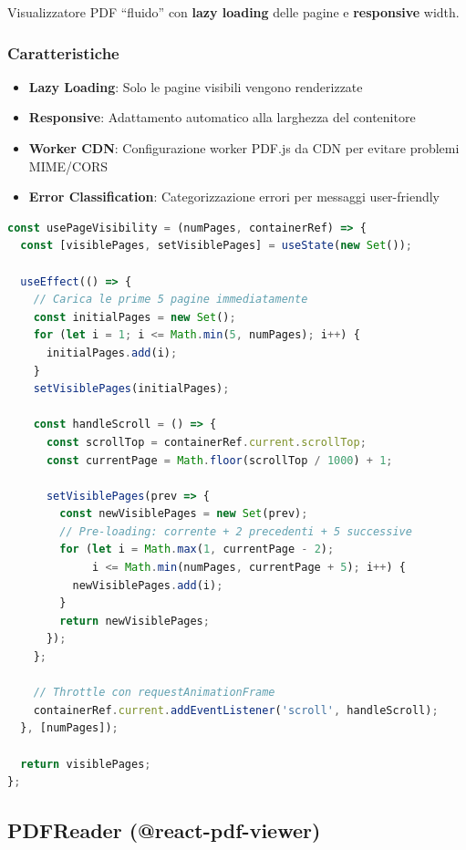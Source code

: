 \documentclass[11pt,a4paper]{article}
\begin{document}
Visualizzatore PDF ``fluido'' con \textbf{lazy loading} delle pagine e \textbf{responsive} width.

\subsubsection{Caratteristiche}

\begin{itemize}[leftmargin=*]
    \item \textbf{Lazy Loading}: Solo le pagine visibili vengono renderizzate
    \item \textbf{Responsive}: Adattamento automatico alla larghezza del contenitore
    \item \textbf{Worker CDN}: Configurazione worker PDF.js da CDN per evitare problemi MIME/CORS
    \item \textbf{Error Classification}: Categorizzazione errori per messaggi user-friendly
\end{itemize}

\begin{lstlisting}[language=JavaScript, caption={Lazy Loading Logic}]
const usePageVisibility = (numPages, containerRef) => {
  const [visiblePages, setVisiblePages] = useState(new Set());

  useEffect(() => {
    // Carica le prime 5 pagine immediatamente
    const initialPages = new Set();
    for (let i = 1; i <= Math.min(5, numPages); i++) {
      initialPages.add(i);
    }
    setVisiblePages(initialPages);

    const handleScroll = () => {
      const scrollTop = containerRef.current.scrollTop;
      const currentPage = Math.floor(scrollTop / 1000) + 1;
      
      setVisiblePages(prev => {
        const newVisiblePages = new Set(prev);
        // Pre-loading: corrente + 2 precedenti + 5 successive
        for (let i = Math.max(1, currentPage - 2); 
             i <= Math.min(numPages, currentPage + 5); i++) {
          newVisiblePages.add(i);
        }
        return newVisiblePages;
      });
    };

    // Throttle con requestAnimationFrame
    containerRef.current.addEventListener('scroll', handleScroll);
  }, [numPages]);

  return visiblePages;
};
\end{lstlisting}

\subsection{PDFReader (@react-pdf-viewer)}
\end{document}
